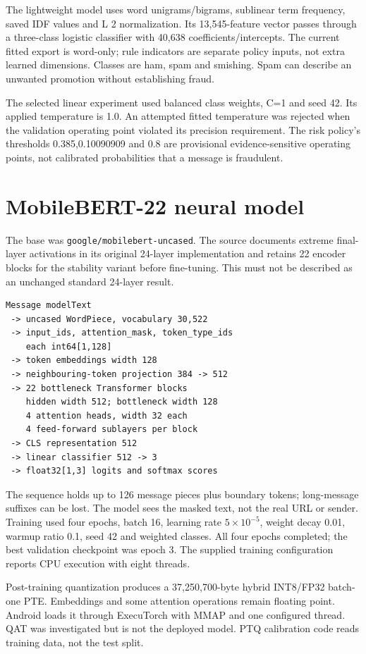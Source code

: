 \documentclass[11pt,a4paper,oneside]{report}
\newcommand{\code}[1]{\nolinkurl{#1}}
\begin{document}
The lightweight model uses word unigrams/bigrams, sublinear term frequency, saved IDF values and L 2 normalization. Its 13,545-feature vector passes through a three-class logistic classifier with 40,638 coefficients/intercepts. The current fitted export is word-only; rule indicators are separate policy inputs, not extra learned dimensions. Classes are ham, spam and smishing. Spam can describe an unwanted promotion without establishing fraud.

The selected linear experiment used balanced class weights, C=1 and seed 42. Its applied temperature is 1.0. An attempted fitted temperature was rejected when the validation operating point violated its precision requirement. The risk policy's thresholds 0.385,0.10090909 and 0.8 are provisional evidence-sensitive operating points, not calibrated probabilities that a message is fraudulent.

\section{MobileBERT-22 neural model}
The base was \code{google/mobilebert-uncased}. The source documents extreme final-layer activations in its original 24-layer implementation and retains 22 encoder blocks for the stability variant before fine-tuning. This must not be described as an unchanged standard 24-layer result.

\begin{lstlisting}
Message modelText
 -> uncased WordPiece, vocabulary 30,522
 -> input_ids, attention_mask, token_type_ids
    each int64[1,128]
 -> token embeddings width 128
 -> neighbouring-token projection 384 -> 512
 -> 22 bottleneck Transformer blocks
    hidden width 512; bottleneck width 128
    4 attention heads, width 32 each
    4 feed-forward sublayers per block
 -> CLS representation 512
 -> linear classifier 512 -> 3
 -> float32[1,3] logits and softmax scores
\end{lstlisting}

The sequence holds up to 126 message pieces plus boundary tokens; long-message suffixes can be lost. The model sees the masked text, not the real URL or sender. Training used four epochs, batch 16, learning rate \(5\times 10^{-5}\), weight decay 0.01, warmup ratio 0.1, seed 42 and weighted classes. All four epochs completed; the best validation checkpoint was epoch 3. The supplied training configuration reports CPU execution with eight threads.

Post-training quantization produces a 37,250,700-byte hybrid INT8/FP32 batch-one PTE. Embeddings and some attention operations remain floating point. Android loads it through ExecuTorch with MMAP and one configured thread. QAT was investigated but is not the deployed model. PTQ calibration code reads training data, not the test split.
\end{document}

